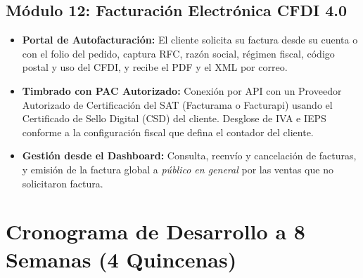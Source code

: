 \documentclass[11pt,letterpaper]{article}
\begin{document}
\subsection{Módulo 12: Facturación Electrónica CFDI 4.0}
\begin{itemize}[leftmargin=1.5cm]
    \item \textbf{Portal de Autofacturación:} El cliente solicita su factura desde su cuenta o con el folio del pedido, captura RFC, razón social, régimen fiscal, código postal y uso del CFDI, y recibe el PDF y el XML por correo.
    \item \textbf{Timbrado con PAC Autorizado:} Conexión por API con un Proveedor Autorizado de Certificación del SAT (Facturama o Facturapi) usando el Certificado de Sello Digital (CSD) del cliente. Desglose de IVA e IEPS conforme a la configuración fiscal que defina el contador del cliente.
    \item \textbf{Gestión desde el Dashboard:} Consulta, reenvío y cancelación de facturas, y emisión de la factura global a \textit{público en general} por las ventas que no solicitaron factura.
\end{itemize}

\section{Cronograma de Desarrollo a 8 Semanas (4 Quincenas)}
\end{document}
